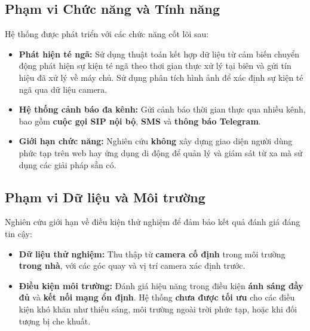 \subsection{Phạm vi Chức năng và Tính năng}
Hệ thống được phát triển với các chức năng cốt lõi sau:
\begin{itemize}
    \item \textbf{Phát hiện té ngã:} Sử dụng thuật toán kết hợp dữ liệu từ cảm biến chuyển động phát hiện sự kiện té ngã theo thơi gian thực xử lý tại biên và gửi tín hiệu đã xử lý về máy chủ. Sử dụng phân tích hình ảnh để xác định sự kiện té ngã qua dữ liệu camera.
    
    \item \textbf{Hệ thống cảnh báo đa kênh:} Gửi cảnh báo thời gian thực qua nhiều kênh, bao gồm \textbf{cuộc gọi SIP nội bộ}, \textbf{SMS} và \textbf{thông báo Telegram}.
    
    \item \textbf{Giới hạn chức năng:} Nghiên cứu \textbf{không} xây dựng giao diện người dùng phức tạp trên web hay ứng dụng di động để quản lý và giám sát từ xa mà sử dụng các giải pháp sẵn có.
\end{itemize}

\subsection{Phạm vi Dữ liệu và Môi trường}
Nghiên cứu giới hạn về điều kiện thử nghiệm để đảm bảo kết quả đánh giá đáng tin cậy:
\begin{itemize}
    \item \textbf{Dữ liệu thử nghiệm:} Thu thập từ \textbf{camera cố định} trong môi trường \textbf{trong nhà}, với các góc quay và vị trí camera xác định trước.
    
    \item \textbf{Điều kiện môi trường:} Đánh giá hiệu năng trong điều kiện \textbf{ánh sáng đầy đủ} và \textbf{kết nối mạng ổn định}. Hệ thống \textbf{chưa được tối ưu} cho các điều kiện khó khăn như thiếu sáng, môi trường ngoài trời phức tạp, hoặc khi đối tượng bị che khuất.
\end{itemize}
